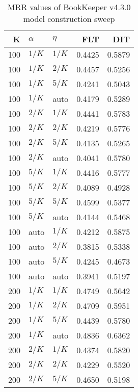 
\begin{table}
\begin{spacing}{1.2}
\centering
\caption{MRR values of BookKeeper v4.3.0 model construction sweep}
\label{table:bookkeeper_model_sweep}
\vspace{0.2em}
\parbox{.45\linewidth}{\centering \begin{tabular}{rll|rr}
\toprule
   K &  $\alpha$ &    $\eta$ & FLT & DIT \\
\midrule
 100 &  $1/K$ &  $1/K$ &           0.4425 & 0.5879 \\
 100 &  $1/K$ &  $2/K$ &           0.4457 & 0.5256 \\
 100 &  $1/K$ &  $5/K$ &           0.4241 & 0.5043 \\
 100 &  $1/K$ &   auto &           0.4179 & 0.5289 \\
 100 &  $2/K$ &  $1/K$ &           0.4441 & 0.5783 \\
 100 &  $2/K$ &  $2/K$ &           0.4219 & 0.5776 \\
 100 &  $2/K$ &  $5/K$ &           0.4135 & 0.5265 \\
 100 &  $2/K$ &   auto &           0.4041 & 0.5780 \\
 100 &  $5/K$ &  $1/K$ &           0.4416 & 0.5777 \\
 100 &  $5/K$ &  $2/K$ &           0.4089 & 0.4928 \\
 100 &  $5/K$ &  $5/K$ &           0.4599 & 0.5377 \\
 100 &  $5/K$ &   auto &           0.4144 & 0.5468 \\
 100 &   auto &  $1/K$ &           0.4212 & 0.5875 \\
 100 &   auto &  $2/K$ &           0.3815 & 0.5338 \\
 100 &   auto &  $5/K$ &           0.4245 & 0.4673 \\
 100 &   auto &   auto &           0.3941 & 0.5197 \\
 200 &  $1/K$ &  $1/K$ &           0.4749 & 0.5642 \\
 200 &  $1/K$ &  $2/K$ &           0.4709 & 0.5951 \\
 200 &  $1/K$ &  $5/K$ &           0.4439 & 0.5780 \\
 200 &  $1/K$ &   auto &           0.4836 & 0.6362 \\
 200 &  $2/K$ &  $1/K$ &           0.4374 & 0.5820 \\
 200 &  $2/K$ &  $2/K$ &           0.4229 & 0.5520 \\
 200 &  $2/K$ &  $5/K$ &           0.4650 & 0.5198 \\

\end{tabular}}
\end{spacing}
\end{table}
